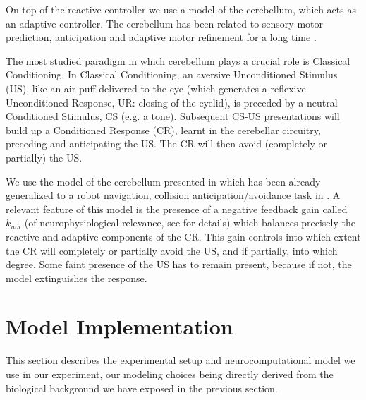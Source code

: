 \documentclass[letterpaper, 10 pt, conference]{ieeeconf}  %
\begin{document}
On top of the reactive controller we use a model of the cerebellum, which acts as an adaptive controller. The cerebellum has been related to sensory-motor prediction, anticipation and adaptive motor refinement for a long time \cite{houk2003}.

The most studied paradigm in which cerebellum plays a crucial role is Classical Conditioning. In Classical Conditioning, an aversive Unconditioned Stimulus (US), like an air-puff delivered to the eye (which generates a reflexive Unconditioned Response, UR: closing of the eyelid), is preceded by a neutral Conditioned Stimulus, CS (e.g. a tone). Subsequent CS-US presentations will build up a Conditioned Response (CR), learnt in the cerebellar circuitry, preceding and anticipating the US. The CR will then avoid (completely or partially) the US.

We use the model of the cerebellum presented in \cite{herreros2013nucleo} which has been already generalized to a robot navigation, collision anticipation/avoidance task in \cite{herreros2013speed}. A relevant feature of this model is the presence of a negative feedback gain called $k_{noi}$ (of neurophysiological relevance, see \cite{herreros2013nucleo} for details) which balances precisely the reactive and adaptive components of the CR. This gain controls into which extent the CR will completely or partially avoid the US, and if partially, into which degree. Some faint presence of the US has to remain present, because if not, the model extinguishes the response.

\section{Model Implementation}
\label{sec:model}

This section describes the experimental setup and neurocomputational model we use in our experiment, our modeling choices being directly derived from the biological background we have exposed in the previous section. 
\end{document}
